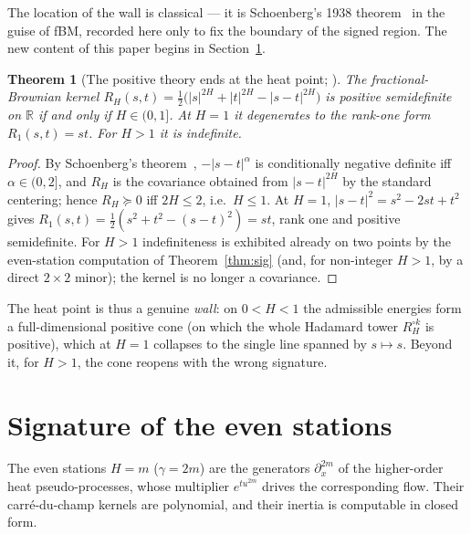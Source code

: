 \documentclass[11pt,reqno]{amsart}
\theoremstyle{plain}
\newtheorem{theorem}{Theorem}[section]
\theoremstyle{definition}
\newcommand{\R}{\mathbb{R}}
\newcommand{\Had}{\mathbin{\circ}}
\begin{document}
The location of the wall is classical --- it is Schoenberg's 1938
theorem~\cite{Schoenberg} in the guise of fBM, recorded here only to fix the
boundary of the signed region. The new content of this paper begins in
Section~\ref{sec:sig}.

\begin{theorem}[The positive theory ends at the heat point;
{\rm \cite{Schoenberg}}]\label{thm:wall}
The fractional-Brownian kernel
$R_H(s,t)=\tfrac12\bigl(|s|^{2H}+|t|^{2H}-|s-t|^{2H}\bigr)$ is positive
semidefinite on $\R$ if and only if $H\in(0,1]$. At $H=1$ it degenerates to the
rank-one form $R_1(s,t)=st$. For $H>1$ it is indefinite.
\end{theorem}

\begin{proof}
By Schoenberg's theorem~\cite{Schoenberg}, $-|s-t|^{\alpha}$ is conditionally
negative definite iff $\alpha\in(0,2]$, and $R_H$ is the covariance obtained from
$|s-t|^{2H}$ by the
standard centering; hence $R_H\succeq0$ iff $2H\le2$, i.e.\ $H\le1$. At $H=1$,
$|s-t|^{2}=s^2-2st+t^2$ gives $R_1(s,t)=\tfrac12(s^2+t^2-(s-t)^2)=st$, rank one and
positive semidefinite. For $H>1$ indefiniteness is exhibited already on two points
by the even-station computation of Theorem~\ref{thm:sig} (and, for non-integer
$H>1$, by a direct $2\times2$ minor); the kernel is no longer a covariance.
\end{proof}

The heat point is thus a genuine \emph{wall}: on $0<H<1$ the admissible energies
form a full-dimensional positive cone (on which the whole Hadamard tower
$R_H^{\Had k}$ is positive), which at $H=1$ collapses to the single line spanned by
$s\mapsto s$. Beyond it, for $H>1$, the cone reopens with the wrong signature.

\section{Signature of the even stations}\label{sec:sig}

The even stations $H=m$ ($\gamma=2m$) are the generators $\partial_x^{2m}$ of the
higher-order heat pseudo-processes, whose multiplier $e^{tu^{2m}}$ drives the
corresponding flow. Their carr\'e-du-champ kernels are polynomial, and their
inertia is computable in closed form.
\end{document}
